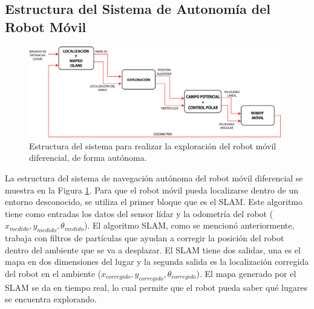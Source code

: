 

\subsection{Estructura del Sistema de Autonomía del Robot Móvil}
\label{sec:NavegacionAutonoma}
\begin{figure}%
	\centering \footnotesize
	\includegraphics[width=0.98\textwidth]{images/estructura_autonomia.jpg}
	\captionsetup{font=footnotesize}
	\caption{Estructura del sistema para realizar la exploración del robot móvil diferencial, de forma autónoma.}
	\label{fig:AutoSist}
\end{figure}

La estructura del sistema de navegación autónoma del robot móvil diferencial se muestra en la
Figura \ref{fig:AutoSist}. Para que el robot móvil pueda localizarse dentro de un entorno 
desconocido, se utiliza el primer bloque que es el SLAM. Este algoritmo tiene como entradas 
los datos del sensor lídar y la odometría del robot ($x_{medido}, y_{medido}, \theta_{medido}$). El
algoritmo SLAM, como se mencionó anteriormente, trabaja con filtros de partículas que ayudan 
a corregir la posición del robot dentro del ambiente que se va a desplazar. El SLAM tiene 
dos salidas, una es el mapa en dos dimensiones del lugar y la segunda salida es la localización
corregida del robot en el ambiente ($x_{corregido}, y_{corregido}, \theta_{corregido}$). El mapa
generado por el SLAM se da en tiempo real, lo cual permite que el robot pueda saber qué lugares se
encuentra explorando.

